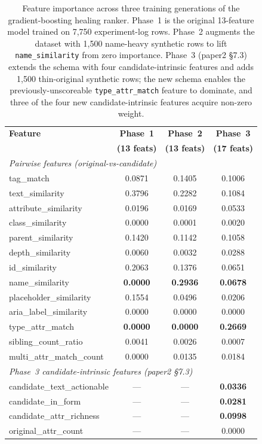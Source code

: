 \begin{table}[H]
\centering
\caption{Feature importance across three training generations of the gradient-boosting healing ranker. Phase~1 is the original 13-feature model trained on 7{,}750 experiment-log rows. Phase~2 augments the dataset with 1{,}500 name-heavy synthetic rows to lift \texttt{name\_similarity} from zero importance. Phase~3 (paper2 §7.3) extends the schema with four candidate-intrinsic features and adds 1{,}500 thin-original synthetic rows; the new schema enables the previously-unscoreable \texttt{type\_attr\_match} feature to dominate, and three of the four new candidate-intrinsic features acquire non-zero weight.}
\label{tab:feature_importance_augmented}
\begin{tabular}{lccc}
\toprule
\textbf{Feature} & \textbf{Phase~1} & \textbf{Phase~2} & \textbf{Phase~3} \\
                 & \textbf{(13 feats)} & \textbf{(13 feats)} & \textbf{(17 feats)} \\
\midrule
\multicolumn{4}{l}{\textit{Pairwise features (original-vs-candidate)}} \\
\midrule
tag\_match               & 0.0871 & 0.1405 & 0.1006 \\
text\_similarity         & 0.3796 & 0.2282 & 0.1084 \\
attribute\_similarity    & 0.0196 & 0.0169 & 0.0533 \\
class\_similarity        & 0.0000 & 0.0001 & 0.0020 \\
parent\_similarity       & 0.1420 & 0.1142 & 0.1058 \\
depth\_similarity        & 0.0060 & 0.0032 & 0.0288 \\
id\_similarity           & 0.2063 & 0.1376 & 0.0651 \\
name\_similarity         & \textbf{0.0000} & \textbf{0.2936} & \textbf{0.0678} \\
placeholder\_similarity  & 0.1554 & 0.0496 & 0.0206 \\
aria\_label\_similarity  & 0.0000 & 0.0000 & 0.0000 \\
type\_attr\_match        & \textbf{0.0000} & \textbf{0.0000} & \textbf{0.2669} \\
sibling\_count\_ratio    & 0.0041 & 0.0026 & 0.0007 \\
multi\_attr\_match\_count & 0.0000 & 0.0135 & 0.0184 \\
\midrule
\multicolumn{4}{l}{\textit{Phase~3 candidate-intrinsic features (paper2 §7.3)}} \\
\midrule
candidate\_text\_actionable & --- & --- & \textbf{0.0336} \\
candidate\_in\_form         & --- & --- & \textbf{0.0281} \\
candidate\_attr\_richness   & --- & --- & \textbf{0.0998} \\
original\_attr\_count       & --- & --- & 0.0000 \\
\bottomrule
\end{tabular}
\end{table}
